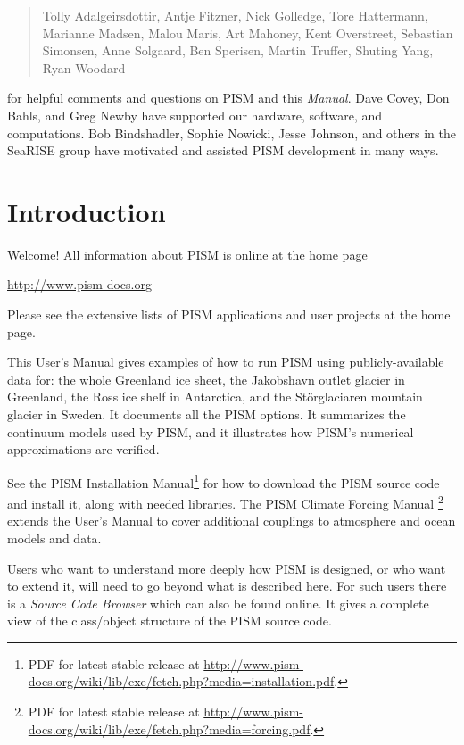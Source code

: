 \documentclass[titlepage,letterpaper,final]{scrartcl}
\begin{document}
\begin{quote}
Tolly Adalgeirsdottir, Antje Fitzner, Nick Golledge, Tore Hattermann, Marianne Madsen, Malou Maris, Art Mahoney, Kent Overstreet, Sebastian Simonsen, Anne Solgaard, Ben Sperisen, Martin Truffer, Shuting Yang, Ryan Woodard
\end{quote}

\noindent for helpful comments and questions on PISM and this \emph{Manual}.  Dave Covey, Don Bahls, and Greg Newby have supported our hardware, software, and computations.  Bob Bindshadler, Sophie Nowicki, Jesse Johnson, and others in the SeaRISE group have motivated and assisted PISM development in many ways.  

\normalsize



\newpage
\setcounter{tocdepth}{3}
\small
\tableofcontents
\normalsize

\newpage


\section{Introduction}\label{sec:intro}

Welcome!  All information about PISM is online at the home page
\begin{center}
  \url{http://www.pism-docs.org}
\end{center}
Please see the extensive lists of PISM applications and user projects at the home page.

This User's Manual gives examples of how to run PISM using publicly-available data for: the whole Greenland ice sheet, the Jakobshavn outlet glacier in Greenland, the Ross ice shelf in Antarctica, and the St\"orglaciaren mountain glacier in Sweden.  It documents all the PISM options.  It summarizes the continuum models used by PISM, and it illustrates how PISM's numerical approximations are verified.

See the PISM Installation Manual\footnote{PDF for latest stable release at \url{http://www.pism-docs.org/wiki/lib/exe/fetch.php?media=installation.pdf}.}
for how to download the PISM source code and install
it, along with needed libraries.  The PISM Climate Forcing Manual
\footnote{PDF for latest stable release at \url{http://www.pism-docs.org/wiki/lib/exe/fetch.php?media=forcing.pdf}.}
extends the User's Manual to cover additional couplings to atmosphere and ocean
models and data.

Users who want to understand more deeply how PISM is designed, or who want to extend it,  will need to go beyond what is described here.  For such users there is a \emph{Source Code Browser} which can also be found online.  It gives a complete view of the class/object structure of the PISM source code.
\end{document}
